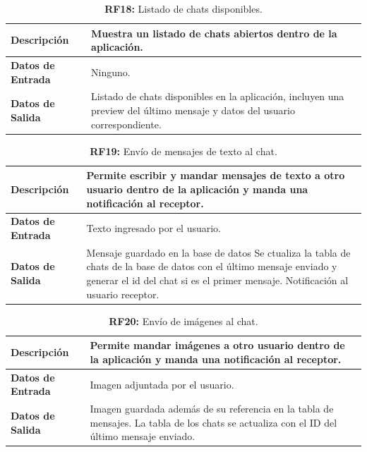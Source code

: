 \documentclass[a4paper, 12pt]{article}
\begin{document}
\begin{table}[H]
\captionsetup{list=no}%
\captionsetup{justification=raggedright,singlelinecheck=false}
\captionsetup{labelformat=empty}
\caption*{\textbf{RF18:} Listado de chats disponibles.}
\label{tab:RF18}
	\begin{tabular}{|m{5cm}|m{10cm}|}
	\hline
	\textbf{Descripción} & Muestra  un listado de chats abiertos dentro de la aplicación. \\ 
	\hline
	\textbf{Datos de Entrada} & Ninguno. \\ 
	\hline
	\textbf{Datos de Salida} & Listado de chats disponibles en la aplicación, incluyen una preview del último mensaje y datos del usuario correspondiente. \\ 
	\hline
\end{tabular}
\end{table}


\begin{table}[H]
\captionsetup{list=no}%
\captionsetup{justification=raggedright,singlelinecheck=false}
\captionsetup{labelformat=empty}
\caption*{\textbf{RF19:} Envío de mensajes de texto al chat.}
\label{tab:RF19}
	\begin{tabular}{|m{5cm}|m{10cm}|}
	\hline
	\textbf{Descripción} & Permite escribir y mandar mensajes de texto a otro usuario dentro de la aplicación y manda una notificación al receptor. \\ 
	\hline
	\textbf{Datos de Entrada} & Texto ingresado por el usuario. \\ 
	\hline
	\textbf{Datos de Salida} & Mensaje guardado en la base de datos Se ctualiza la tabla de chats de la base de datos con el último mensaje enviado y generar el id del chat si es el primer mensaje. Notificación al usuario receptor. \\ 
	\hline
\end{tabular}
\end{table}


\begin{table}[H]
\captionsetup{list=no}%
\captionsetup{justification=raggedright,singlelinecheck=false}
\captionsetup{labelformat=empty}
\caption*{\textbf{RF20:} Envío de imágenes al chat.}
\label{tab:RF20}
	\begin{tabular}{|m{5cm}|m{10cm}|}
\hline
	\textbf{Descripción} & Permite mandar imágenes a otro usuario dentro de la aplicación y manda una notificación al receptor. \\ 
	\hline
	\textbf{Datos de Entrada} & Imagen adjuntada por el usuario. \\ 
	\hline
	\textbf{Datos de Salida} & Imagen guardada además de su referencia en la tabla de mensajes. La tabla de los chats se actualiza con el ID del último mensaje enviado. \\ 
	\hline
\end{tabular}
\end{table}
\end{document}
